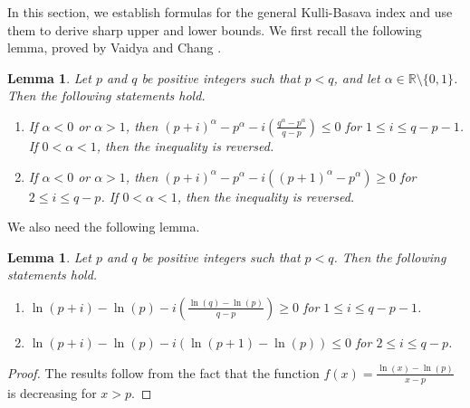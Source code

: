\documentclass[11pt, oneside]{amsart}   	%
\newtheorem{lemma}[theorem]{Lemma}
\theoremstyle{definition}
\theoremstyle{remark}
\numberwithin{equation}{section}
\begin{document}
In this section, we establish formulas for the general Kulli-Basava index and use them to derive sharp upper and lower bounds. We first recall the following lemma, proved by Vaidya and Chang \cite{vaidya2024sharp}.

\begin{lemma}\label{Lemma}
Let $p$ and $q$ be positive integers such that $p<q$, and let $\alpha\in\mathbb{R}\setminus\{0,1\}$. Then the following statements hold.
\begin{enumerate}
\item If $\alpha<0$ or $\alpha>1$, then $(p+i)^\alpha-p^\alpha-i\left(\frac{q^\alpha-p^\alpha}{q-p}\right)\leq 0$ for $1\leq i\leq q-p-1$. If $0<\alpha<1$, then the inequality is reversed.

\item If $\alpha<0$ or $\alpha>1$, then $(p+i)^\alpha-p^\alpha-i((p+1)^\alpha-p^\alpha)\geq 0$ for $2\leq i\leq q-p$. If $0<\alpha<1$, then the inequality is reversed.

\end{enumerate}
\end{lemma}

We also need the following lemma.

\begin{lemma}\label{Lemma2}
Let $p$ and $q$ be positive integers such that $p<q$. Then the following statements hold.
\begin{enumerate}
\item $\ln(p+i)-\ln(p)-i\left(\frac{\ln(q)-\ln(p)}{q-p}\right)\geq 0$ for $1\leq i\leq q-p-1$.

\item $\ln(p+i)-\ln(p)-i(\ln(p+1)-\ln(p))\leq 0$ for $2\leq i\leq q-p$.

\end{enumerate}
\end{lemma}
\begin{proof}
The results follow from the fact that the function $f(x)=\frac{\ln(x)-\ln(p)}{x-p}$ is decreasing for $x>p$.
\end{proof}
\end{document}
